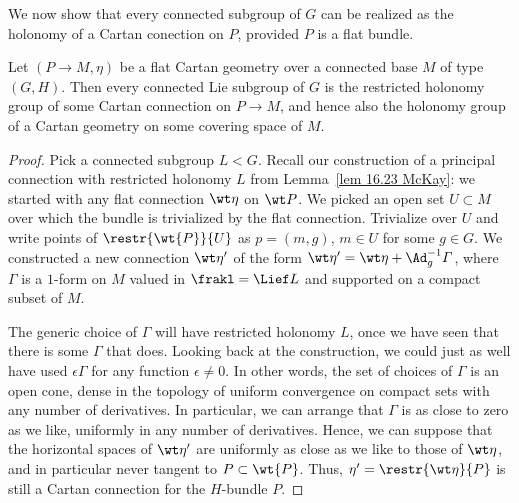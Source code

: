 We now show that every connected subgroup of $G$ can be realized as the holonomy of a Cartan conection on $P$, provided $P$ is a flat bundle.

\begin{thm}\label{thm 16.31 McKay}
    Let $(P\to M,\eta)$ be a flat Cartan geometry over a connected base $M$ of type $(G,H)$. Then every connected Lie subgroup of $G$ is the restricted holonomy group of some Cartan connection on $P\to M$, and hence also the holonomy group of a Cartan geometry on some covering space of $M$.
\end{thm}
\begin{proof}
    Pick a connected subgroup $L<G$. Recall our construction of a principal connection with restricted holonomy $L$ from Lemma~\ref{lem 16.23 McKay}: we started with any flat connection $\wt\eta$ on $\wt P$. We picked an open set $U\subset M$ over which the bundle is trivialized by the flat connection. Trivialize over $U$ and write points of $\restr{\wt{P}}{U}$ as $p=(m,g)$, $m\in U$ for some $g\in G$. We constructed a new connection $\wt\eta'$ of the form $\wt\eta'=\wt\eta+\Ad_g^{-1}\varGamma$, where $\varGamma$ is a $1$-form on $M$ valued in $\frakl=\Lief L$ and supported on a compact subset of $M$.

    The generic choice of $\varGamma$ will have restricted holonomy $L$, once we have seen that there is some $\varGamma$ that does. Looking back at the construction, we could just as well have used $\epsilon\varGamma$ for any function $\epsilon\neq 0$. In other words, the set of choices of $\varGamma$ is an open cone, dense in the topology of uniform convergence on compact sets with any number of derivatives. In particular, we can arrange that $\varGamma$ is as close to zero as we like, uniformly in any number of derivatives. Hence, we can suppose that the horizontal spaces of $\wt\eta'$ are uniformly as close as we like to those of $\wt\eta$, and in particular never tangent to $P\subset \wt{P}$. Thus, $\eta'=\restr{\wt\eta}{P}$ is still a Cartan connection for the $H$-bundle $P$.
\end{proof}

